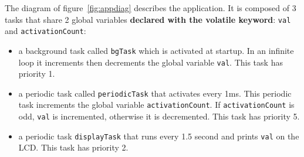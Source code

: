 \documentclass[11pt]{report}
\begin{document}
The diagram of figure~\ref{fig:appdiag} describes the application.
It is composed of 3 tasks that share 2 global variables {\bf declared with the volatile keyword}: \texttt{val} and \texttt{activationCount}:
\begin{itemize}
\item a background task called \texttt{bgTask} which is activated at startup. In an infinite loop it increments then decrements the global variable \texttt{val}. This task has priority 1.
\item a periodic task called \texttt{periodicTask} that activates every 1ms. This periodic task increments the global variable \texttt{activationCount}. If \texttt{activationCount} is odd, \texttt{val} is incremented, otherwise it is decremented. This task has priority 5.
\item a periodic task \texttt{displayTask} that runs every 1.5 second and prints \texttt{val} on the LCD. This task has priority 2.
\end{itemize}

\def\alarm#1#2{
  \node[alarm](#1) [#2] {};
  \coordinate (a) at ($(#1.north)$);
  \coordinate (b) at ($(#1.north east)$);
  \coordinate (c) at ($(#1.north west)$);
  \coordinate (d) at ($(#1)$);
  \draw[thick] ($(a)+(-0.1,0)$) rectangle ($(a)+(0.1,0.1)$);
  \draw[rotate=-45,thick] ($(b)+(-0.05,0)$) rectangle ($(b)+(0.05,0.1)$);
  \draw[rotate=45,thick] ($(c)+(-0.05,0)$) rectangle ($(c)+(0.05,0.1)$);
  \draw ($(d)+(0.3,0)$) -- (d) -- ($(d)+(0,0.3)$);
  \node [font=\scriptsize,below=0.5mm of #1] {{\em Alarm}}
}

\def\sharedvar#1#2#3{
  \node (#1) [#2] {#1};
  \coordinate (a) at ($(#1.north #3) + (0,0.2)$);
  \coordinate (b) at ($(#1.south #3) + (0,-0.2)$);
  \draw[ultra thick] (a) -- (b);
  \draw ($(a)+(-0.1,0)$) -- ($(a)+(0.1,0)$);
  \draw ($(b)+(-0.1,0)$) -- ($(b)+(0.1,0)$)
}

\def\varrect#1{
  \draw ($(#1.south west)$) rectangle ($(#1.north east)$)
}
\end{document}
